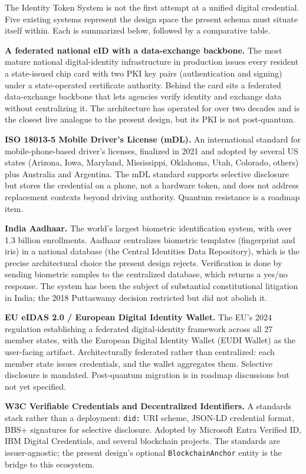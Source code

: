 \documentclass[11pt,letterpaper]{article}
\newcommand{\entity}[1]{\texttt{\color{navydark}#1}}
\begin{document}
The Identity Token System is not the first attempt at a unified digital credential. Five existing systems represent the design space the present schema must situate itself within. Each is summarized below, followed by a comparative table.

\textbf{A federated national eID with a data-exchange backbone.} The most mature national digital-identity infrastructure in production issues every resident a state-issued chip card with two PKI key pairs (authentication and signing) under a state-operated certificate authority. Behind the card sits a federated data-exchange backbone that lets agencies verify identity and exchange data without centralizing it. The architecture has operated for over two decades and is the closest live analogue to the present design, but its PKI is not post-quantum.

\textbf{ISO 18013-5 Mobile Driver's License (mDL).} An international standard for mobile-phone-based driver's licenses, finalized in 2021 and adopted by several US states (Arizona, Iowa, Maryland, Mississippi, Oklahoma, Utah, Colorado, others) plus Australia and Argentina. The mDL standard supports selective disclosure but stores the credential on a phone, not a hardware token, and does not address replacement contexts beyond driving authority. Quantum resistance is a roadmap item.

\textbf{India Aadhaar.} The world's largest biometric identification system, with over 1.3 billion enrollments. Aadhaar centralizes biometric templates (fingerprint and iris) in a national database (the Central Identities Data Repository), which is the precise architectural choice the present design rejects. Verification is done by sending biometric samples to the centralized database, which returns a yes/no response. The system has been the subject of substantial constitutional litigation in India; the 2018 Puttaswamy decision restricted but did not abolish it.

\textbf{EU eIDAS 2.0 / European Digital Identity Wallet.} The EU's 2024 regulation establishing a federated digital-identity framework across all 27 member states, with the European Digital Identity Wallet (EUDI Wallet) as the user-facing artifact. Architecturally federated rather than centralized: each member state issues credentials, and the wallet aggregates them. Selective disclosure is mandated. Post-quantum migration is in roadmap discussions but not yet specified.

\textbf{W3C Verifiable Credentials and Decentralized Identifiers.} A standards stack rather than a deployment: \texttt{did:} URI scheme, JSON-LD credential format, BBS+ signatures for selective disclosure. Adopted by Microsoft Entra Verified ID, IBM Digital Credentials, and several blockchain projects. The standards are issuer-agnostic; the present design's optional \entity{BlockchainAnchor} entity is the bridge to this ecosystem.
\end{document}
